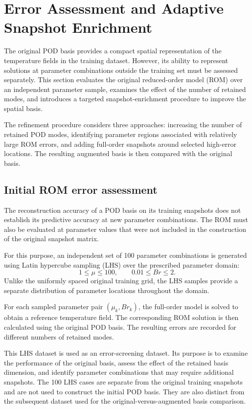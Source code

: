 \section{Error Assessment and Adaptive Snapshot Enrichment}
\label{sec:pod_enrichment}

The original POD basis provides a compact spatial representation
of the temperature fields in the training dataset. However, its
ability to represent solutions at parameter combinations outside
the training set must be assessed separately. This section
evaluates the original reduced-order model (ROM) over an
independent parameter sample, examines the effect of the number
of retained modes, and introduces a targeted snapshot-enrichment
procedure to improve the spatial basis.

The refinement procedure considers three approaches: increasing
the number of retained POD modes, identifying parameter regions
associated with relatively large ROM errors, and adding
full-order snapshots around selected high-error locations.
The resulting augmented basis is then compared with the original
basis.

\subsection{Initial ROM error assessment}

The reconstruction accuracy of a POD basis on its training
snapshots does not establish its predictive accuracy at new
parameter combinations. The ROM must also be evaluated at
parameter values that were not included in the construction
of the original snapshot matrix.

For this purpose, an independent set of 100 parameter
combinations is generated using Latin hypercube sampling (LHS)
over the prescribed parameter domain:
\[
1\leq\mu\leq100,
\qquad
0.01\leq Br\leq2.
\]
Unlike the uniformly spaced original training grid, the LHS
samples provide a separate distribution of parameter locations
throughout the domain.

For each sampled parameter pair $(\mu_k,Br_k)$, the full-order
model is solved to obtain a reference temperature field.
The corresponding ROM solution is then calculated using the
original POD basis. The resulting errors are recorded for
different numbers of retained modes.

This LHS dataset is used as an error-screening dataset. Its
purpose is to examine the performance of the original basis,
assess the effect of the retained basis dimension, and identify
parameter combinations that may require additional snapshots.
The 100 LHS cases are separate from the original training
snapshots and are not used to construct the initial POD basis.
They are also distinct from the subsequent dataset used for
the original-versus-augmented basis comparison.

